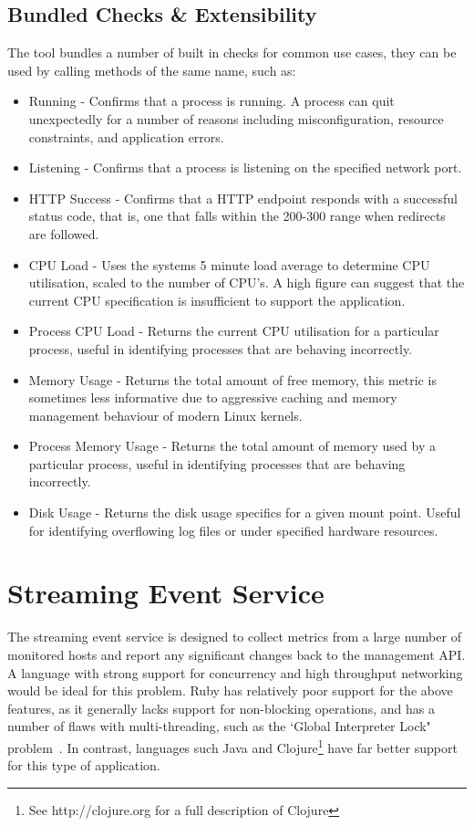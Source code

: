 \documentclass{cshonours}
\begin{document}
\subsection{Bundled Checks \& Extensibility}
\label{bundledchecks}

The tool bundles a number of built in checks for common use cases, they can be used by calling methods of the same name, such as:

\begin{itemize}
  \item {Running} - Confirms that a process is running. A process can quit unexpectedly for a number of reasons including misconfiguration, resource constraints, and application errors.
  \item {Listening} - Confirms that a process is listening on the specified network port.
  \item {HTTP Success} - Confirms that a HTTP endpoint responds with a successful status code, that is, one that falls within the 200-300 range when redirects are followed.
  \item {CPU Load} - Uses the systems 5 minute load average to determine CPU utilisation, scaled to the number of CPU's. A high figure can suggest that the current CPU specification is insufficient to support the application.
  \item {Process CPU Load} - Returns the current CPU utilisation for a particular process, useful in identifying processes that are behaving incorrectly.
  \item {Memory Usage} - Returns the total amount of free memory, this metric is sometimes less informative due to aggressive caching and memory management behaviour of modern Linux kernels.
  \item {Process Memory Usage} - Returns the total amount of memory used by a particular process, useful in identifying processes that are behaving incorrectly.
  \item {Disk Usage} - Returns the disk usage specifics for a given mount point. Useful for identifying overflowing log files or under specified hardware resources.
\end{itemize}

\pagebreak
\section{Streaming Event Service}

The streaming event service is designed to collect metrics from a large number of monitored hosts and report any significant changes back to the management API\@. A language with strong support for concurrency and high throughput networking would be ideal for this problem. Ruby has relatively poor support for the above features, as it generally lacks support for non-blocking operations, and has a number of flaws with multi-threading, such as the `Global Interpreter Lock" problem~\cite{RubyGIL}. In contrast, languages such Java and Clojure\footnote{See http://clojure.org for a full description of Clojure} have far better support for this type of application.
\end{document}

